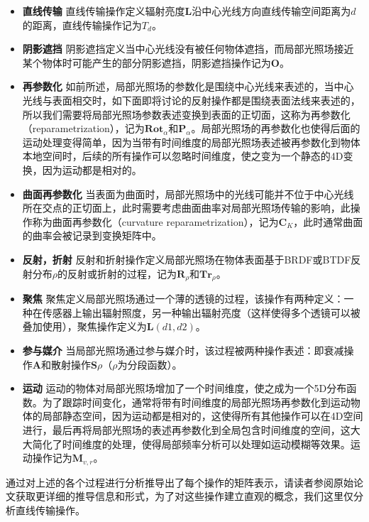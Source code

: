 \begin{itemize}
	\item \textbf{直线传输 } 直线传输操作定义辐射亮度$\mathbf{L}$沿中心光线方向直线传输空间距离为$d$的距离，直线传输操作记为$T_d$。
	\item \textbf{阴影遮挡 } 阴影遮挡定义当中心光线没有被任何物体遮挡，而局部光照场接近某个物体时可能产生的部分阴影遮挡，阴影遮挡操作记为$\mathbf{O}$。
	\item \textbf{再参数化 } 如前所述，局部光照场的参数化是围绕中心光线来表述的，当中心光线与表面相交时，如下面即将讨论的反射操作都是围绕表面法线来表述的，所以我们需要将局部光照场参数表述变换到表面的正切面，这称为再参数化（reparametrization），记为$\mathbf{Rot}_\alpha$和$\mathbf{P}_\alpha$。局部光照场的再参数化也使得后面的运动处理变得简单，因为当带有时间维度的局部光照场表述被再参数化到物体本地空间时，后续的所有操作可以忽略时间维度，使之变为一个静态的4D变换，因为运动都是相对的。
	\item \textbf{曲面再参数化 } 当表面为曲面时，局部光照场中的光线可能并不位于中心光线所在交点的正切面上，此时需要考虑曲面曲率对局部光照场传输的影响，此操作称为曲面再参数化（curvature reparametrization），记为$\mathbf{C}_K$，此时通常曲面的曲率会被记录到变换矩阵中。
	\item \textbf{反射，折射 } 反射和折射操作定义局部光照场在物体表面基于BRDF或BTDF反射分布$\rho$的反射或折射的过程，记为$\mathbf{R}_\rho$和$\mathbf{Tr}_\rho$。
	\item \textbf{聚焦 } 聚焦定义局部光照场通过一个薄的透镜的过程，该操作有两种定义：一种在传感器上输出辐射照度，另一种输出辐射亮度（这样使得多个透镜可以被叠加使用），聚焦操作定义为$\mathbf{L}(d1,d2)$。
	\item \textbf{参与媒介 } 当局部光照场通过参与媒介时，该过程被两种操作表述：即衰减操作$\mathbf{A}$和散射操作$\mathbf{S}\rho$（$\rho$为分段函数）。
	\item \textbf{运动 } 运动的物体对局部光照场增加了一个时间维度，使之成为一个5D分布函数。为了跟踪时间变化，通常将带有时间维度的局部光照场再参数化到运动物体的局部静态空间，因为运动都是相对的，这使得所有其他操作可以在4D空间进行，最后再将局部光照场的表述再参数化到全局包含时间维度的空间，这大大简化了时间维度的处理，使得局部频率分析可以处理如运动模糊等效果。运动操作记为$\mathbf{M}_{v,r}$。
\end{itemize}

\cite{a:AFrequencyAnalysisofLightTransportfromtheorytoimplementation}通过对上述的各个过程进行分析推导出了每个操作的矩阵表示，请读者参阅原始论文获取更详细的推导信息和形式，为了对这些操作建立直观的概念，我们这里仅分析直线传输操作。

